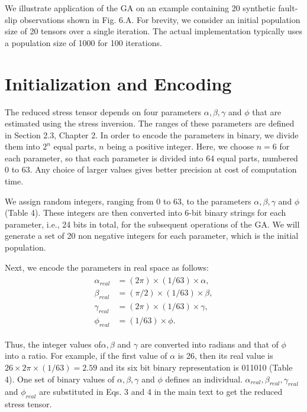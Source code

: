 \onehalfspacing
We illustrate application of the GA on an example containing 20 synthetic fault-slip observations shown in Fig. 6.A. For brevity, we consider an initial population size of 20 tensors over a single iteration. The actual implementation typically uses a population size of 1000 for 100 iterations.

\section{Initialization and Encoding}
The reduced stress tensor depends on four parameters $\alpha, \beta, \gamma$ and $\phi$ that are estimated using the stress inversion. The ranges of these parameters are defined in Section 2.3, Chapter 2. In order to encode the parameters in binary, we divide them into $2^n$ equal parts, $n$ being a positive integer. Here, we choose $n = 6$ for each parameter, so that each parameter is divided into 64 equal parts, numbered 0 to 63. Any choice of larger values gives better precision at cost of computation time.

We assign random integers, ranging from 0 to 63, to the parameters $\alpha, \beta, \gamma$ and $\phi$ (Table 4). These integers are then converted into 6-bit binary strings for each parameter, i.e., 24 bits in total, for the subsequent operations of the GA. We will generate a set of 20 non negative integers for each parameter, which is the initial population.

Next, we encode the parameters in real space as follows:
\begin{align} \label{222}
\begin{split}
    \alpha_{real} &= (2\pi) \times (1/63) \times \alpha, \\
    \beta_{real} &= (\pi/2) \times (1/63) \times \beta, \\
    \gamma_{real} &= (2\pi) \times (1/63) \times \gamma, \\
    \phi_{real} &= (1/63) \times \phi.
\end{split}
\end{align}

Thus, the integer values of$\alpha, \beta$ and $\gamma$ are converted into radians and that of $\phi$ into a ratio. For example, if the first value of $\alpha$ is 26, then its real value is $26 \times 2\pi \times (1/63) = 2.59$ and its six bit binary representation is 011010 (Table 4). One set of binary values of $\alpha, \beta, \gamma$ and $\phi$ defines an individual. $\alpha_{real}, \beta_{real}, \gamma_{real}$ and $\phi_{real}$ are substituted in Eqs. 3 and 4 in the main text to get the reduced stress tensor.

